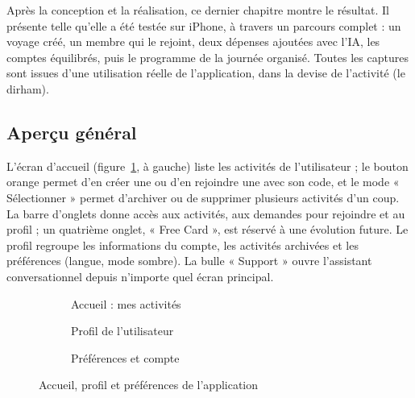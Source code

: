 
Après la conception et la réalisation, ce dernier chapitre montre le résultat. Il présente
\equipay telle qu'elle a été testée sur iPhone, à travers un parcours complet : un voyage créé, un membre qui le rejoint, deux dépenses ajoutées avec l'IA, les
comptes équilibrés, puis le programme de la journée organisé. Toutes les captures sont
issues d'une utilisation réelle de l'application, dans la devise de l'activité (le dirham).

\subsection{Aperçu général}

L'écran d'accueil (figure~\ref{fig:ecran_accueil}, à gauche) liste les activités de
l'utilisateur ; le bouton orange permet d'en créer une ou d'en rejoindre une avec son code,
et le mode « Sélectionner » permet d'archiver ou de supprimer plusieurs activités d'un coup.
La barre d'onglets donne accès aux activités, aux demandes pour rejoindre et au profil ; un
quatrième onglet, « Free Card », est réservé à une évolution future. Le profil regroupe les
informations du compte, les activités archivées et les préférences (langue, mode sombre). La
bulle « Support » ouvre l'assistant conversationnel depuis n'importe quel écran principal.

\begin{figure}[H]
\centering
\begin{subfigure}[t]{0.31\textwidth}\centering{}\caption{Accueil : mes activités}\end{subfigure}\hfill
\begin{subfigure}[t]{0.31\textwidth}\centering{}\caption{Profil de l'utilisateur}\end{subfigure}\hfill
\begin{subfigure}[t]{0.31\textwidth}\centering{}\caption{Préférences et compte}\end{subfigure}
\caption{Accueil, profil et préférences de l'application}
\label{fig:ecran_accueil}
\end{figure}

